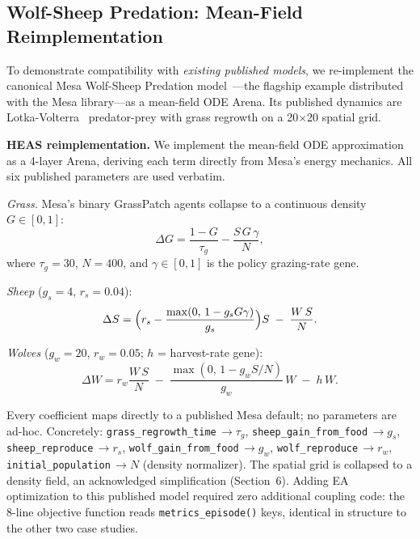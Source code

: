 \documentclass{wscpaperproc}
\begin{document}
\subsection{Wolf-Sheep Predation: Mean-Field Reimplementation}
\label{sec:wolfsheep}

To demonstrate compatibility with \emph{existing published models}, we
re-implement the canonical Mesa Wolf-Sheep Predation model~\cite{wilensky1997wolfsheep,kazil2020mesa}---the flagship example distributed with the Mesa library---as a mean-field ODE Arena.
Its published dynamics are Lotka-Volterra~\cite{lotka1925elements,volterra1926variazioni} predator-prey with grass regrowth on a
20$\times$20 spatial grid.

\textbf{HEAS reimplementation.} We implement the mean-field ODE approximation as a
4-layer Arena, deriving each term directly from Mesa's energy mechanics.
All six published parameters are used verbatim.

\textit{Grass.} Mesa's binary GrassPatch agents collapse to a continuous
density $G\in[0,1]$:
\begin{equation}
  \Delta G = \frac{1-G}{\tau_g} - \frac{S\,G\,\gamma}{N},
  \label{eq:grass}
\end{equation}
where $\tau_g\!=\!30$, $N\!=\!400$, and $\gamma\!\in\![0,1]$ is the policy
grazing-rate gene.

\textit{Sheep} ($g_s\!=\!4$, $r_s\!=\!0.04$):
\begin{equation}
  \Delta S = \Bigl(r_s - \frac{\max(0,\,1-g_s G\gamma)}{g_s}\Bigr)S
             \;-\; \frac{W\,S}{N}.
  \label{eq:sheep}
\end{equation}

\textit{Wolves} ($g_w\!=\!20$, $r_w\!=\!0.05$; $h$ = harvest-rate gene):
\begin{equation}
  \Delta W = r_w \frac{W\,S}{N}
             \;-\; \frac{\max(0,\,1-g_w S/N)}{g_w}\,W
             \;-\; h\,W.
  \label{eq:wolf}
\end{equation}

Every coefficient maps directly to a published Mesa default; no parameters
are ad-hoc. Concretely: \texttt{grass\_regrowth\_time}\,$\to\!\tau_g$,
\texttt{sheep\_gain\_from\_food}\,$\to\!g_s$,
\texttt{sheep\_reproduce}\,$\to\!r_s$,
\texttt{wolf\_gain\_from\_food}\,$\to\!g_w$,
\texttt{wolf\_reproduce}\,$\to\!r_w$,
\texttt{initial\_population}\,$\to\!N$ (density normalizer). The spatial grid
is collapsed to a density field, an acknowledged simplification (Section~6).
Adding EA optimization to this published model required zero additional coupling
code: the 8-line objective function reads \texttt{metrics\_episode()} keys,
identical in structure to the other two case studies.
\end{document}
